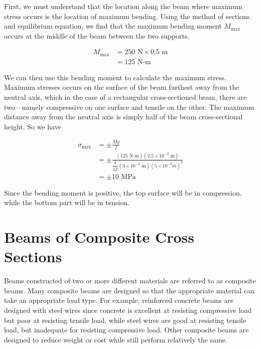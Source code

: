 \documentclass[
10pt,
a4paper,
openany,
svgnames,
]{kaobook} %
\begin{document}
\begin{solution}
  First, we must understand that the location along the beam where maximum stress occurs is the location of maximum bending. Using the method of sections and equilibrium equation, we find that the maximum bending moment $M_{\max}$ occurs at the middle of the beam between the two supports.

  \begin{align*}
    M_{\max} &= 250 \text{ N} \times 0.5 \text{ m} \\
             &= 125 \text{ N-m}
  \end{align*}
  
  We can then use this bending moment to calculate the maximum stress. Maximum stresses occurs on the surface of the beam furthest away from the neutral axis, which in the case of a rectangular cross-sectioned beam, there are two—namely compressive on one surface and tensile on the other. The maximum distance away from the neutral axis is simply half of the beam cross-sectional height. So we have
  
  \begin{align*}
    \sigma_{\max} &= \pm \frac{My}{I} \\
                  &= \pm \frac{(125 \text{ N-m})(2.5 \times 10^{-2} \text{ m})}{ \dfrac{1}{12}(3 \times 10^{-2} \text{ m})(5 \times 10^{-2} m)^3} \\
                  &= \pm 10 \text{ MPa}
  \end{align*}
  
Since the bending moment is positive, the top surface will be in compression, while the bottom part will be in tension.
\end{solution}

\section{Beams of Composite Cross Sections}

Beams constructed of two or more different materials are referred to as composite beams. Many composite beams are designed so that the appropriate material can take an appropriate load type. For example, reinforced concrete beams are designed with steel wires since concrete is excellent at resisting compressive load but poor at resisting tensile load, while steel wires are good at resisting tensile load, but inadequate for resisting compressive load. Other composite beams are designed to reduce weight or cost while still perform relatively the same.
\end{document}
